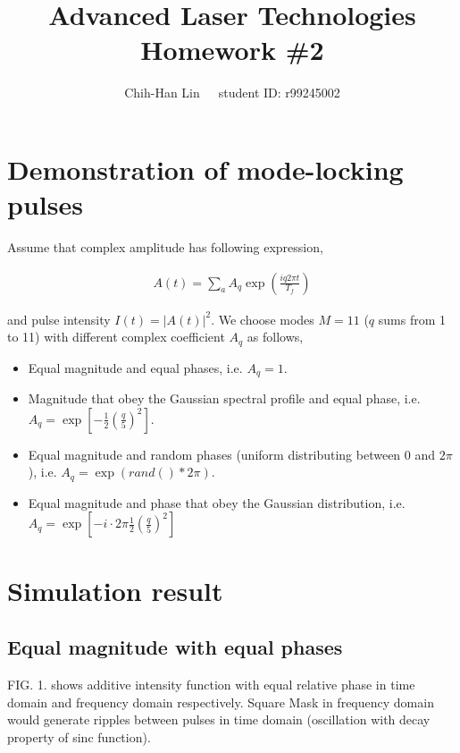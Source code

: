 \documentclass[pra,onecolumn,reprint]{revtex4}
\begin{document}
\title{Advanced Laser Technologies  Homework \#2}
\author{Chih-Han Lin~~~student ID: r99245002}


\maketitle


\section{Demonstration of mode-locking pulses}
Assume that complex amplitude has following expression,

\begin{align*}
A(t)=\sum_a A_q \exp\left(\frac{iq2\pi t}{T_f}\right)
\end{align*}

\noindent and pulse intensity $I(t)=|A(t)|^2$. We choose modes $M=11$ ($q$ sums from 1 to 11) with different complex coefficient 
$A_q$ as follows,

\begin{itemize}
\item [(a)] Equal magnitude and equal phases, i.e. $A_q=1$.
\item [(b)] Magnitude that obey the Gaussian spectral profile and  equal phase, i.e. $A_q=\exp\left[-\frac{1}{2}\left(\frac{q}{5}\right)^2\right]$.
\item [(c)] Equal magnitude and random phases (uniform distributing between 0 and $2\pi$), i.e. $A_q=\exp(rand()*2\pi)$.
\item [(d)] Equal magnitude and phase that obey the Gaussian distribution, i.e. $A_q=\exp \left[-i\cdot 2\pi\frac{1}{2}\left(\frac{q}{5}\right)^2\right]$
\end{itemize}

\section{Simulation result}
\subsection{Equal magnitude with equal phases}

FIG. 1. shows additive intensity function with equal relative phase in time domain and frequency domain respectively. Square Mask in  frequency domain would generate ripples between pulses in time domain (oscillation with decay property of sinc function).   
\end{document}
